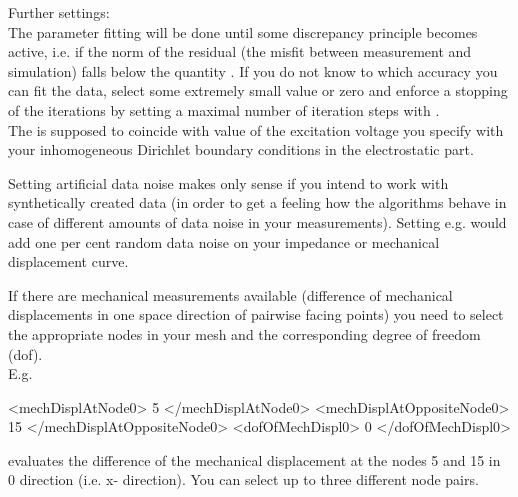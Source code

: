 \noindent Further settings: \\
The parameter fitting will be done until some discrepancy principle becomes
active, i.e. if the norm of the residual (the misfit between measurement and
simulation) falls below the quantity . If you do not know to
which accuracy you can fit the data, select some extremely small value or zero
and enforce a stopping of the iterations by setting a maximal number of
iteration steps with .
\\ 
The  is supposed to
coincide with value of the excitation voltage you specify with your
inhomogeneous Dirichlet boundary conditions in the electrostatic part.

Setting artificial data noise makes only sense if you intend to work with
synthetically created data (in order to get a feeling how the algorithms behave
in case of different amounts of data noise in your measurements). Setting e.g.
would add one per cent random data noise on your impedance or mechanical
displacement curve. 

If there are mechanical measurements available (difference of mechanical
displacements in one space direction of pairwise facing points) you need to
select the appropriate nodes in your mesh and the corresponding degree of
freedom (dof).\\
 E.g.  \\ 
\begin{xmllisting}
  <mechDisplAtNode0> 5 </mechDisplAtNode0>
  <mechDisplAtOppositeNode0> 15 </mechDisplAtOppositeNode0>
  <dofOfMechDispl0> 0 </dofOfMechDispl0>
\end{xmllisting}
 evaluates the difference of the mechanical displacement at the nodes 5 and 15
in $0$ direction (i.e. x- direction). You can select up to three different node
pairs.

